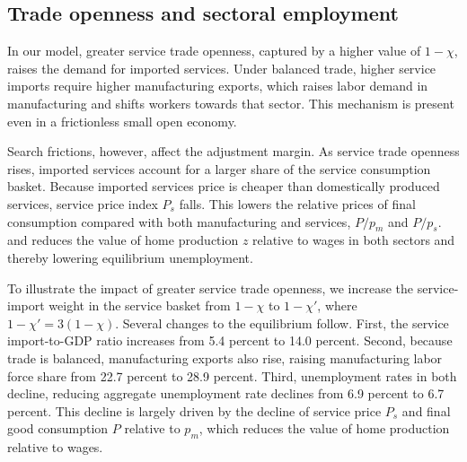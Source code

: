 \documentclass[12pt]{article} %
\theoremstyle{definition}
\begin{document}
\subsection{Trade openness and sectoral employment}


In our model, greater service trade openness, captured by a higher value of $1-\chi$,  raises the demand for imported services. Under balanced trade, higher service imports require higher manufacturing exports, which raises labor demand in manufacturing and shifts workers towards that sector.   This mechanism is present even in a frictionless small open economy. 

Search frictions, however, affect the adjustment margin. As service trade openness rises, imported services account for a larger share of the service consumption basket. Because imported services price is cheaper than domestically produced services, service price index $P_s$ falls. This lowers the relative prices of final consumption compared with both manufacturing and services, $P/p_m$  and $P/p_s$. and reduces the value of home production $z$ relative to wages in both sectors and thereby lowering equilibrium unemployment. 

To illustrate the impact of greater service trade openness, we increase the service-import weight in the service basket from $1-\chi$ to $1-\chi'$,  where $1-\chi' = 3(1-\chi)$. Several changes to the equilibrium follow. First, the service import-to-GDP ratio increases from 5.4 percent to 14.0 percent. Second, because trade is balanced, manufacturing exports also rise, raising  manufacturing labor force share from 22.7 percent to 28.9 percent. Third, unemployment rates in both decline, reducing aggregate unemployment rate declines from 6.9 percent to 6.7 percent. This decline is largely driven by the decline of service price $P_s$ and final good consumption $P$ relative to $p_m$, which reduces the value of home production relative to wages. 


\end{document}
